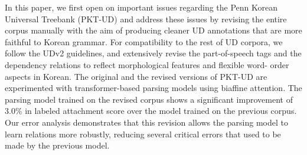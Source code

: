 In this paper, we first open on important issues regarding the Penn Korean Universal Treebank (PKT-UD) and address these issues by revising the entire corpus manually with the aim of producing cleaner UD annotations that are more faithful to Korean grammar. For compatibility to the rest of UD corpora, we follow the UDv2 guidelines, and extensively revise the part-of-speech tags and the dependency relations to reflect morphological features and flexible word- order aspects in Korean. The original and the revised versions of PKT-UD are experimented with transformer-based parsing models using biaffine attention. The parsing model trained on the revised corpus shows a significant improvement of 3.0\% in labeled attachment score over the model trained on the previous corpus. Our error analysis demonstrates that this revision allows the parsing model to learn relations more robustly, reducing several critical errors that used to be made by the previous model.
